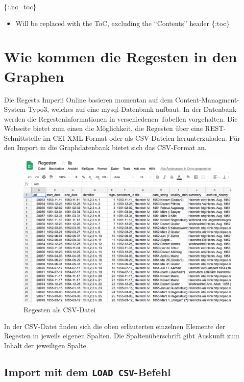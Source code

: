 \documentclass[ngerman,]{scrreprt}
\providecommand{\tightlist}{%
  \setlength{\itemsep}{0pt}\setlength{\parskip}{0pt}}
\begin{document}
\{:.no\_toc\}

\begin{itemize}
\tightlist
\item
  Will be replaced with the ToC, excluding the ``Contents'' header \{:toc\}
\end{itemize}

\chapter{Wie kommen die Regesten in den Graphen}\label{wie-kommen-die-regesten-in-den-graphen}

Die Regesta Imperii Online basieren momentan auf dem Content-Managment-System Typo3, welches auf eine mysql-Datenbank aufbaut. In der Datenbank werden die Regesteninformationen in verschiedenen Tabellen vorgehalten. Die Webseite bietet zum einen die Möglichkeit, die Regesten über eine REST-Schnittstelle im CEI-XML-Format oder als CSV-Dateien herunterzuladen. Für den Import in die Graphdatenbank bietet sich das CSV-Format an.

\begin{figure}
\centering
\includegraphics{Bilder/RI2Graph/ReggH4-Regestentabelle.png}
\caption{Regesten als CSV-Datei}
\end{figure}

In der CSV-Datei finden sich die oben erläuterten einzelnen Elemente der Regesten in jeweils eigenen Spalten. Die Spaltenüberschrift gibt Auskunft zum Inhalt der jeweiligen Spalte.

\section{\texorpdfstring{Import mit dem \texttt{LOAD\ CSV}-Befehl}{Import mit dem LOAD CSV-Befehl}}\label{import-mit-dem-load-csv-befehl}
\end{document}
